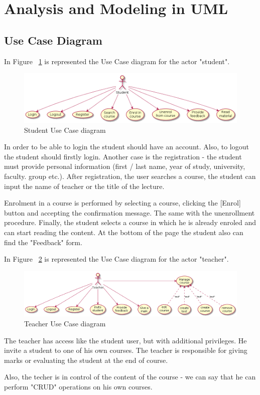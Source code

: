 \documentclass[12pt,a4paper,titlepage]{article}
\begin{document}
\section{Analysis and Modeling in UML}
\subsection{Use Case Diagram}
In Figure ~\ref{fig:2student} is represented the Use Case diagram for the actor "student".
\begin{figure}[H]
\centering
\includegraphics[width=\textwidth]{2student}
\caption{Student Use Case diagram}
\label{fig:2student}
\end{figure}

In order to be able to login the student should have an account. Also, to logout the student should firstly login. Another case is the registration - the student must provide personal information (first / last name, year of study, university, faculty. group etc.). After registration, the user searches a course, the student can input the name of teacher or the title of the lecture.\par
Enrolment in a course is performed by selecting a course, clicking the [Enrol] button and accepting the confirmation message. The same with the unenrollment procedure.
Finally, the student selects a course in which he is already enroled and can start reading the content.
At the bottom of the page the student also can find the "Feedback" form.
\clearpage

In Figure ~\ref{fig:2teacher} is represented the Use Case diagram for the actor "teacher".
\begin{figure}[H]
\centering
\includegraphics[width=\textwidth]{2teacher}
\caption{Teacher Use Case diagram}
\label{fig:2teacher}
\end{figure}
The teacher has access like the student user, but with additional privileges. He invite a student to one of his own courses. The teacher is responsible for giving marks or evaluating the student at the end of course.\par
Also, the techer is in control of the content of the course - we can say that he can perform "CRUD" operations on his own courses.
\end{document}
